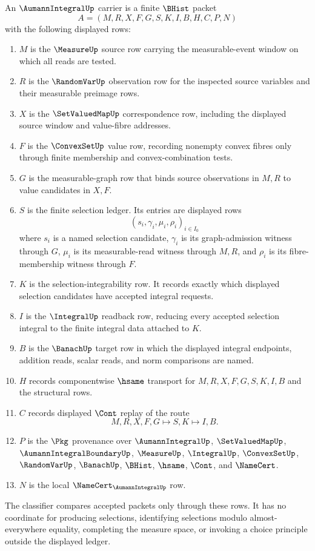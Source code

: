 \begin{definition}
\label{def:aumann-integral-carrier}
An $\AumannIntegralUp$ carrier is a finite $\BHist$ packet
$$
A=(M,R,X,F,G,S,K,I,B,H,C,P,N)
$$
with the following displayed rows:
\begin{enumerate}
\item $M$ is the $\MeasureUp$ source row carrying the measurable-event window on which all reads are tested.
\item $R$ is the $\RandomVarUp$ observation row for the inspected source variables and their measurable preimage rows.
\item $X$ is the $\SetValuedMapUp$ correspondence row, including the displayed source window and value-fibre addresses.
\item $F$ is the $\ConvexSetUp$ value row, recording nonempty convex fibres only through finite membership and convex-combination tests.
\item $G$ is the measurable-graph row that binds source observations in $M,R$ to value candidates in $X,F$.
\item $S$ is the finite selection ledger. Its entries are displayed rows
$$
(s_i,\gamma_i,\mu_i,\rho_i)_{i\in I_0}
$$
where $s_i$ is a named selection candidate, $\gamma_i$ is its graph-admission witness through $G$, $\mu_i$ is its measurable-read witness through $M,R$, and $\rho_i$ is its fibre-membership witness through $F$.
\item $K$ is the selection-integrability row. It records exactly which displayed selection candidates have accepted integral requests.
\item $I$ is the $\IntegralUp$ readback row, reducing every accepted selection integral to the finite integral data attached to $K$.
\item $B$ is the $\BanachUp$ target row in which the displayed integral endpoints, addition reads, scalar reads, and norm comparisons are named.
\item $H$ records componentwise $\hsame$ transport for $M,R,X,F,G,S,K,I,B$ and the structural rows.
\item $C$ records displayed $\Cont$ replay of the route
$$
M,R,X,F,G \longmapsto S,K \longmapsto I,B .
$$
\item $P$ is the $\Pkg$ provenance over $\AumannIntegralUp$, $\SetValuedMapUp$, $\AumannIntegralBoundaryUp$, $\MeasureUp$, $\IntegralUp$, $\ConvexSetUp$, $\RandomVarUp$, $\BanachUp$, $\BHist$, $\hsame$, $\Cont$, and $\NameCert$.
\item $N$ is the local $\NameCert_{\AumannIntegralUp}$ row.
\end{enumerate}
The classifier compares accepted packets only through these rows. It has no coordinate for producing selections, identifying selections modulo almost-everywhere equality, completing the measure space, or invoking a choice principle outside the displayed ledger.
\end{definition}

